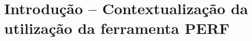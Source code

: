 \documentclass[conference,compsoc]{IEEEtran}
\begin{document}
  \maketitle







  \IEEEpeerreviewmaketitle






  \section{Introdução -- Contextualização da utilização da ferramenta PERF}  
  
\end{document}
